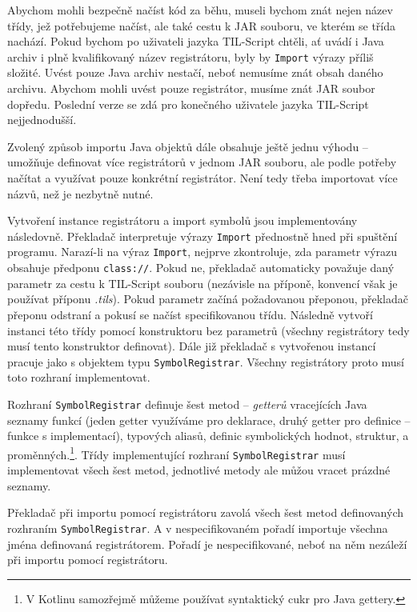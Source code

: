 Abychom mohli bezpečně načíst kód za běhu, museli bychom znát nejen název třídy, jež potřebujeme
načíst, ale také cestu k JAR souboru, ve kterém se třída nachází. Pokud bychom po uživateli jazyka
TIL-Script chtěli, ať uvádí i Java archiv i plně kvalifikovaný název registrátoru, byly by
\lstinline{Import} výrazy příliš složité. Uvést pouze Java archiv nestačí, neboť nemusíme znát obsah
daného archivu. Abychom mohli uvést pouze registrátor, musíme znát JAR soubor dopředu. Poslední
verze se zdá pro konečného uživatele jazyka TIL-Script nejjednodušší.

Zvolený způsob importu Java objektů dále obsahuje ještě jednu výhodu -- umožňuje definovat více
registrátorů v jednom JAR souboru, ale podle potřeby načítat a využívat pouze konkrétní registrátor.
Není tedy třeba importovat více názvů, než je nezbytně nutné.

Vytvoření instance registrátoru a import symbolů jsou implementovány následovně. Překladač
interpretuje výrazy \lstinline{Import} přednostně hned při spuštění programu. Narazí-li na výraz
\lstinline{Import}, nejprve zkontroluje, zda parametr výrazu obsahuje předponu \lstinline{class://}.
Pokud ne, překladač automaticky považuje daný parametr za cestu k TIL-Script souboru (nezávisle
na příponě, konvencí však je používat příponu \textit{.tils}). Pokud parametr začíná požadovanou
přeponou, překladač přeponu odstraní a pokusí se načíst specifikovanou třídu. Následně vytvoří
instanci této třídy pomocí konstruktoru bez parametrů (všechny registrátory tedy musí tento
konstruktor definovat). Dále již překladač s vytvořenou instancí pracuje jako s objektem typu
\lstinline{SymbolRegistrar}. Všechny registrátory proto musí toto rozhraní implementovat.

Rozhraní \lstinline{SymbolRegistrar} definuje šest metod -- \textit{getterů} vracejících Java
seznamy funkcí (jeden getter využíváme pro deklarace, druhý getter pro definice -- funkce
s implementací), typových aliasů, definic symbolických hodnot, struktur, a proměnných.\footnote{
  V Kotlinu samozřejmě můžeme používat syntaktický cukr pro Java gettery.}.
Třídy implementující rozhraní \lstinline{SymbolRegistrar} musí implementovat všech šest metod,
jednotlivé metody ale můžou vracet prázdné seznamy.

Překladač při importu pomocí registrátoru zavolá všech šest metod definovaných rozhraním
\lstinline{SymbolRegistrar}. A v nespecifikovaném pořadí importuje všechna jména definovaná
registrátorem. Pořadí je nespecifikované, neboť na něm nezáleží při importu pomocí registrátoru.

